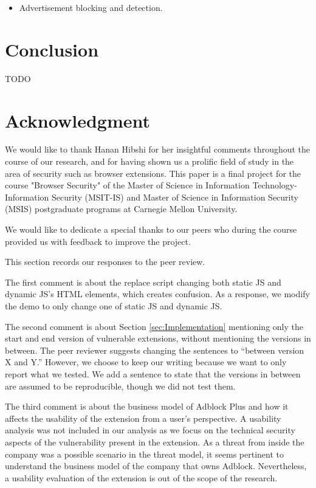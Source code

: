 \documentclass[conference]{IEEEtran}
\begin{document}
\begin{itemize}
\item Advertisement blocking and detection.
\end{itemize}

\section{Conclusion}
TODO

\section*{Acknowledgment}
We would like to thank Hanan Hibshi for her insightful comments throughout the course of our research, and for having shown us a prolific field of study in the area of security such as browser extensions. This paper is a final project for the course "Browser Security" of the Master of Science in Information Technology-Information Security (MSIT-IS) and Master of Science in Information Security (MSIS) postgraduate programs at Carnegie Mellon University. 

We would like to dedicate a special thanks to our peers who during the course provided us with feedback to improve the project.




\appendix

This section records our responses to the peer review.

The first comment is about the replace script changing both static JS and dynamic JS's HTML elements, which creates confusion. As a response, we modify the demo to only change one of static JS and dynamic JS.

The second comment is about Section \ref{sec:Implementation} mentioning only the start and end version of vulnerable extensions, without mentioning the versions in between. The peer reviewer suggests changing the sentences to ``between version X and Y.'' However, we choose to keep our writing because we want to only report what we tested. We add a sentence to state that the versions in between are assumed to be reproducible, though we did not test them.

The third comment is about the business model of Adblock Plus and how it affects the usability of the extension from a user's perspective. A usability analysis was not included in our analysis as we focus on the technical security aspects of the vulnerability present in the extension. As a threat from inside the company was a possible scenario in the threat model, it seems pertinent to understand the business model of the company that owns Adblock. Nevertheless, a usability evaluation of the extension is out of the scope of the research.
\end{document}
